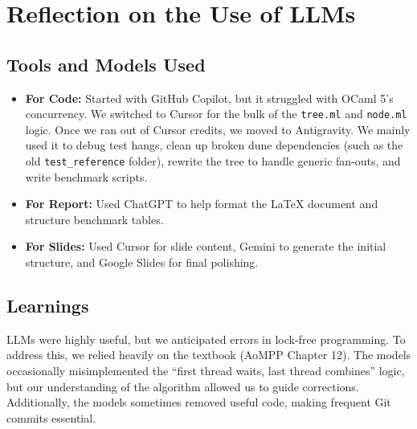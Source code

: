 \documentclass[11pt,a4paper]{article}
\begin{document}
\section{Reflection on the Use of LLMs}
\label{sec:llm}
\subsection*{Tools and Models Used}

\begin{itemize}
    \item \textbf{For Code:} Started with GitHub Copilot, but it struggled with OCaml 5's concurrency. We switched to Cursor for the bulk of the \texttt{tree.ml} and \texttt{node.ml} logic. Once we ran out of Cursor credits, we moved to Antigravity. We mainly used it to debug test hangs, clean up broken dune dependencies (such as the old \texttt{test\_reference} folder), rewrite the tree to handle generic fan-outs, and write benchmark scripts.
    
    \item \textbf{For Report:} Used ChatGPT to help format the \LaTeX{} document and structure benchmark tables.
    
    \item \textbf{For Slides:} Used Cursor for slide content, Gemini to generate the initial structure, and Google Slides for final polishing.
\end{itemize}

\subsection*{Learnings}
LLMs were highly useful, but we anticipated errors in lock-free programming. To address this, we relied heavily on the textbook (AoMPP Chapter 12). The models occasionally misimplemented the ``first thread waits, last thread combines'' logic, but our understanding of the algorithm allowed us to guide corrections. Additionally, the models sometimes removed useful code, making frequent Git commits essential.
\end{document}
